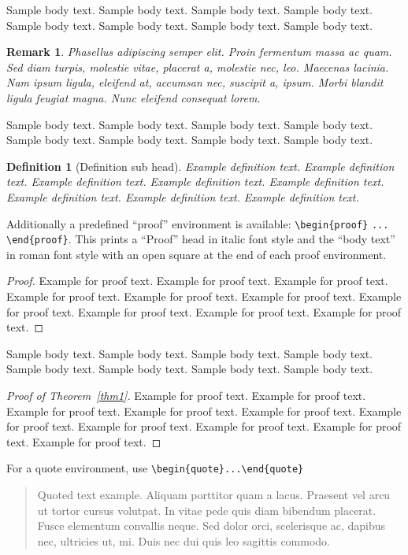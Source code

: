 \documentclass[pdflatex,sn-mathphys-num]{sn-jnl}%
\theoremstyle{thmstyleone}%
\theoremstyle{thmstyletwo}%
\newtheorem{remark}{Remark}%
\theoremstyle{thmstylethree}%
\newtheorem{definition}{Definition}%
\begin{document}
Sample body text. Sample body text. Sample body text. Sample body text. Sample body text. Sample body text. Sample body text. Sample body text.

\begin{remark}
Phasellus adipiscing semper elit. Proin fermentum massa
ac quam. Sed diam turpis, molestie vitae, placerat a, molestie nec, leo. Maecenas lacinia. Nam ipsum ligula, eleifend
at, accumsan nec, suscipit a, ipsum. Morbi blandit ligula feugiat magna. Nunc eleifend consequat lorem. 
\end{remark}

Sample body text. Sample body text. Sample body text. Sample body text. Sample body text. Sample body text. Sample body text. Sample body text.

\begin{definition}[Definition sub head]
Example definition text. Example definition text. Example definition text. Example definition text. Example definition text. Example definition text. Example definition text. Example definition text. 
\end{definition}

Additionally a predefined ``proof'' environment is available: \verb+\begin{proof}+ \verb+...+ \verb+\end{proof}+. This prints a ``Proof'' head in italic font style and the ``body text'' in roman font style with an open square at the end of each proof environment. 

\begin{proof}
Example for proof text. Example for proof text. Example for proof text. Example for proof text. Example for proof text. Example for proof text. Example for proof text. Example for proof text. Example for proof text. Example for proof text. 
\end{proof}

Sample body text. Sample body text. Sample body text. Sample body text. Sample body text. Sample body text. Sample body text. Sample body text.

\begin{proof}[Proof of Theorem~{\upshape\ref{thm1}}]
Example for proof text. Example for proof text. Example for proof text. Example for proof text. Example for proof text. Example for proof text. Example for proof text. Example for proof text. Example for proof text. Example for proof text. 
\end{proof}

\noindent
For a quote environment, use \verb+\begin{quote}...\end{quote}+
\begin{quote}
Quoted text example. Aliquam porttitor quam a lacus. Praesent vel arcu ut tortor cursus volutpat. In vitae pede quis diam bibendum placerat. Fusce elementum
convallis neque. Sed dolor orci, scelerisque ac, dapibus nec, ultricies ut, mi. Duis nec dui quis leo sagittis commodo.
\end{quote}
\end{document}
